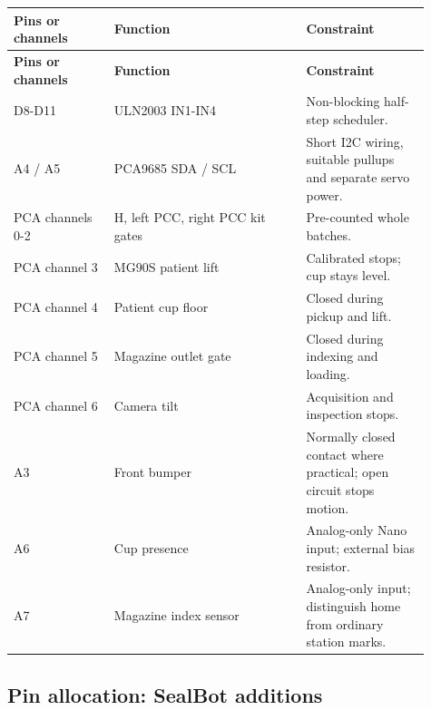 \documentclass[10pt,a4paper]{article}
\begin{document}
\small\begin{longtable}{@{}>{\raggedright\arraybackslash}p{0.22\linewidth}>{\raggedright\arraybackslash}p{0.42\linewidth}>{\raggedright\arraybackslash}p{0.27\linewidth}@{}}
\toprule
\textbf{Pins or channels} & \textbf{Function} & \textbf{Constraint} \\
\midrule\endfirsthead
\toprule\textbf{Pins or channels} & \textbf{Function} & \textbf{Constraint} \\\midrule\endhead
D8-D11 & ULN2003 IN1-IN4 & Non-blocking half-step scheduler. \\[3pt]
A4 / A5 & PCA9685 SDA / SCL & Short I2C wiring, suitable pullups and separate servo power. \\[3pt]
PCA channels 0-2 & H, left PCC, right PCC kit gates & Pre-counted whole batches. \\[3pt]
PCA channel 3 & MG90S patient lift & Calibrated stops; cup stays level. \\[3pt]
PCA channel 4 & Patient cup floor & Closed during pickup and lift. \\[3pt]
PCA channel 5 & Magazine outlet gate & Closed during indexing and loading. \\[3pt]
PCA channel 6 & Camera tilt & Acquisition and inspection stops. \\[3pt]
A3 & Front bumper & Normally closed contact where practical; open circuit stops motion. \\[3pt]
A6 & Cup presence & Analog-only Nano input; external bias resistor. \\[3pt]
A7 & Magazine index sensor & Analog-only input; distinguish home from ordinary station marks. \\[3pt]
\bottomrule\end{longtable}\normalsize
{}\subsection{Pin allocation: SealBot additions}
\end{document}
